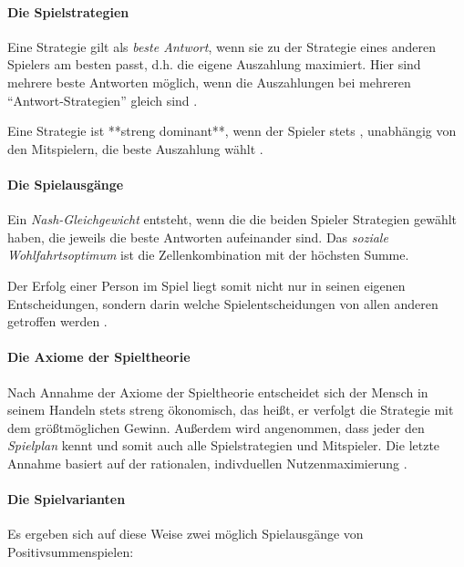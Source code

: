 \paragraph{Die Spielstrategien}

Eine Strategie gilt als \emph{beste Antwort}, wenn sie zu der Strategie eines anderen Spielers am besten passt, d.h. die eigene Auszahlung maximiert.
Hier sind mehrere beste Antworten möglich, wenn die Auszahlungen bei mehreren ``Antwort-Strategien'' gleich sind \parencite[vgl.][153]{Kleinberg-2009-oz}.

Eine Strategie ist **streng dominant**, wenn der Spieler  stets , unabhängig von den Mitspielern, die beste Auszahlung wählt \parencite[vgl.][164]{Kleinberg-2009-oz}.


\paragraph{Die Spielausgänge}

Ein \emph{Nash-Gleichgewicht } entsteht, wenn die die beiden Spieler Strategien gewählt haben, die jeweils die beste Antworten aufeinander sind.
Das \emph{soziale Wohlfahrtsoptimum} ist die Zellenkombination mit der höchsten Summe.

Der Erfolg einer Person im Spiel liegt somit nicht nur in seinen eigenen Entscheidungen, sondern darin welche Spielentscheidungen von allen anderen getroffen werden \parencite[vgl.][156]{Kleinberg-2009-oz}.


\paragraph{Die Axiome der Spieltheorie}

Nach Annahme der Axiome der Spieltheorie entscheidet sich der Mensch in seinem Handeln stets streng ökonomisch, das heißt, er verfolgt die Strategie mit dem größtmöglichen Gewinn.
Außerdem wird angenommen, dass jeder den \emph{Spielplan} kennt und somit auch alle Spielstrategien und Mitspieler.
Die letzte Annahme basiert auf der rationalen, indivduellen Nutzenmaximierung \parencite[vgl.][159]{Kleinberg-2009-oz}.


\paragraph{Die Spielvarianten}

Es ergeben sich auf diese Weise zwei möglich Spielausgänge von Positivsummenspielen:

